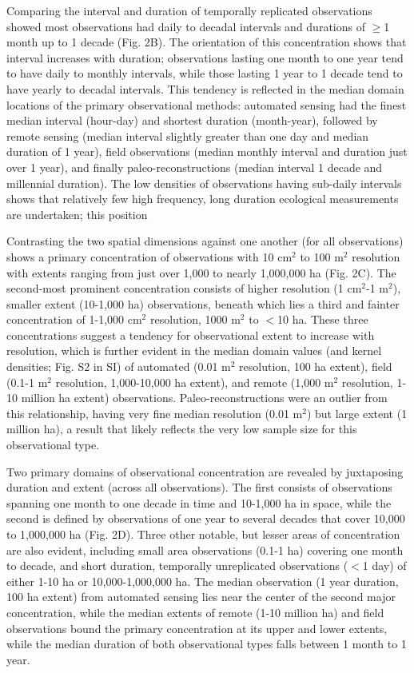\documentclass[12pt]{article}
\begin{document}
Comparing the interval and duration of temporally replicated observations showed most observations had daily to decadal intervals and durations of $\geq$1 month up to 1 decade (Fig. 2B). The orientation of this concentration shows that interval increases with duration; observations lasting one month to one year tend to have daily to monthly intervals, while those lasting 1 year to 1 decade tend to have yearly to decadal intervals. This tendency is reflected in the median domain locations of the primary observational methods: automated sensing had the finest median interval (hour-day) and shortest duration (month-year), followed by remote sensing (median interval slightly greater than one day and median duration of 1 year), field observations (median monthly interval and duration just over 1 year), and finally paleo-reconstructions (median interval 1 decade and millennial duration). The low densities of observations having sub-daily intervals shows that relatively few high frequency, long duration ecological measurements are undertaken; this position

Contrasting the two spatial dimensions against one another (for all observations) shows a primary concentration of observations with 10 cm$^2$ to 100 m$^2$ resolution with extents ranging from just over 1,000 to nearly 1,000,000 ha (Fig. 2C). The second-most prominent concentration consists of higher resolution (1 cm$^2$-1 m$^2$), smaller extent (10-1,000 ha) observations, beneath which lies a third and fainter concentration of 1-1,000 cm$^2$ resolution, 1000 m$^2$ to $<$10 ha. These three concentrations suggest a tendency for observational extent to increase with resolution, which is further evident in the median domain values (and kernel densities; Fig. S2 in SI) of automated (0.01 m$^2$ resolution, 100 ha extent), field (0.1-1 m$^2$ resolution, 1,000-10,000 ha extent), and remote (1,000 m$^2$ resolution, 1-10 million ha extent) observations.  Paleo-reconstructions were an outlier from this relationship, having very fine median resolution (0.01 m$^2$) but large extent (1 million ha), a result that likely reflects the very low sample size for this observational type. 

Two primary domains of observational concentration are revealed by juxtaposing duration and extent (across all observations). The first consists of observations spanning one month to one decade in time and 10-1,000 ha in space, while the second is defined by observations of one year to several decades that cover 10,000 to 1,000,000 ha (Fig. 2D).  Three other notable, but lesser areas of concentration are also evident, including small area observations (0.1-1 ha) covering one month to decade, and short duration, temporally unreplicated observations ($<$1 day) of either 1-10 ha or 10,000-1,000,000 ha.  The median observation (1 year duration, 100 ha extent) from automated sensing lies near the center of the second major concentration, while the median extents of remote (1-10 million ha) and field observations bound the primary concentration at its upper and lower extents, while the median duration of both observational types falls between 1 month to 1 year. 
\end{document}
